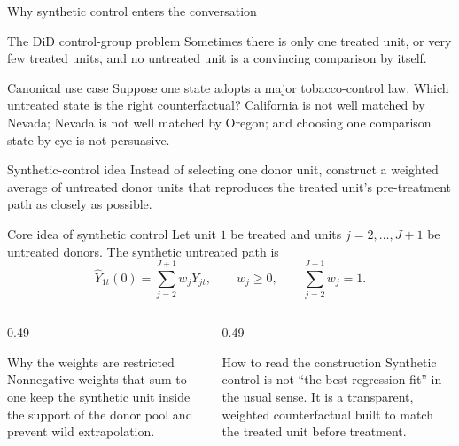 \documentclass[10pt]{beamer}
\begin{document}
\begin{frame}{Why synthetic control enters the conversation}
\label{slide:sc_motivation}
\small
\begin{block}{The DiD control-group problem}
Sometimes there is only one treated unit, or very few treated units, and no untreated unit is a convincing comparison by itself.
\end{block}

\begin{exampleblock}{Canonical use case}
Suppose one state adopts a major tobacco-control law. Which untreated state is the right counterfactual? California is not well matched by Nevada; Nevada is not well matched by Oregon; and choosing one comparison state by eye is not persuasive.
\end{exampleblock}

\begin{alertblock}{Synthetic-control idea}
Instead of selecting one donor unit, construct a weighted average of untreated donor units that reproduces the treated unit's pre-treatment path as closely as possible.
\end{alertblock}
\end{frame}

\begin{frame}{Core idea of synthetic control}
\label{slide:sc_idea}
\small
Let unit $1$ be treated and units $j=2,\ldots,J+1$ be untreated donors. The synthetic untreated path is
\[
\widehat{Y}_{1t}(0)
=
\sum_{j=2}^{J+1} w_j Y_{jt},
\qquad
w_j\ge 0,
\qquad
\sum_{j=2}^{J+1} w_j = 1.
\]

\begin{columns}[T]
\begin{column}{0.49\textwidth}
\begin{block}{Why the weights are restricted}
Nonnegative weights that sum to one keep the synthetic unit inside the support of the donor pool and prevent wild extrapolation.
\end{block}
\end{column}
\begin{column}{0.49\textwidth}
\begin{block}{How to read the construction}
Synthetic control is not ``the best regression fit'' in the usual sense. It is a transparent, weighted counterfactual built to match the treated unit before treatment.
\end{block}
\end{column}
\end{columns}
\end{frame}
\end{document}
